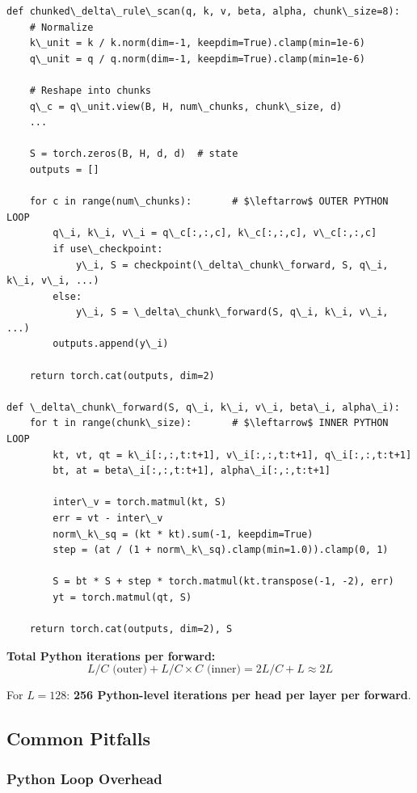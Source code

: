 \begin{lstlisting}
def chunked\_delta\_rule\_scan(q, k, v, beta, alpha, chunk\_size=8):
    # Normalize
    k\_unit = k / k.norm(dim=-1, keepdim=True).clamp(min=1e-6)
    q\_unit = q / q.norm(dim=-1, keepdim=True).clamp(min=1e-6)
    
    # Reshape into chunks
    q\_c = q\_unit.view(B, H, num\_chunks, chunk\_size, d)
    ...
    
    S = torch.zeros(B, H, d, d)  # state
    outputs = []
    
    for c in range(num\_chunks):       # $\leftarrow$ OUTER PYTHON LOOP
        q\_i, k\_i, v\_i = q\_c[:,:,c], k\_c[:,:,c], v\_c[:,:,c]
        if use\_checkpoint:
            y\_i, S = checkpoint(\_delta\_chunk\_forward, S, q\_i, k\_i, v\_i, ...)
        else:
            y\_i, S = \_delta\_chunk\_forward(S, q\_i, k\_i, v\_i, ...)
        outputs.append(y\_i)
    
    return torch.cat(outputs, dim=2)

def \_delta\_chunk\_forward(S, q\_i, k\_i, v\_i, beta\_i, alpha\_i):
    for t in range(chunk\_size):       # $\leftarrow$ INNER PYTHON LOOP
        kt, vt, qt = k\_i[:,:,t:t+1], v\_i[:,:,t:t+1], q\_i[:,:,t:t+1]
        bt, at = beta\_i[:,:,t:t+1], alpha\_i[:,:,t:t+1]
        
        inter\_v = torch.matmul(kt, S)
        err = vt - inter\_v
        norm\_k\_sq = (kt * kt).sum(-1, keepdim=True)
        step = (at / (1 + norm\_k\_sq).clamp(min=1.0)).clamp(0, 1)
        
        S = bt * S + step * torch.matmul(kt.transpose(-1, -2), err)
        yt = torch.matmul(qt, S)
    
    return torch.cat(outputs, dim=2), S
\end{lstlisting}

\textbf{Total Python iterations per forward:}
\[
L/C \text{ (outer)} + L/C \times C \text{ (inner)} = 2L/C + L \approx 2L
\]

For $L = 128$: \textbf{256 Python-level iterations per head per layer per forward}.

\subsection{Common Pitfalls}

\subsubsection{Python Loop Overhead}

